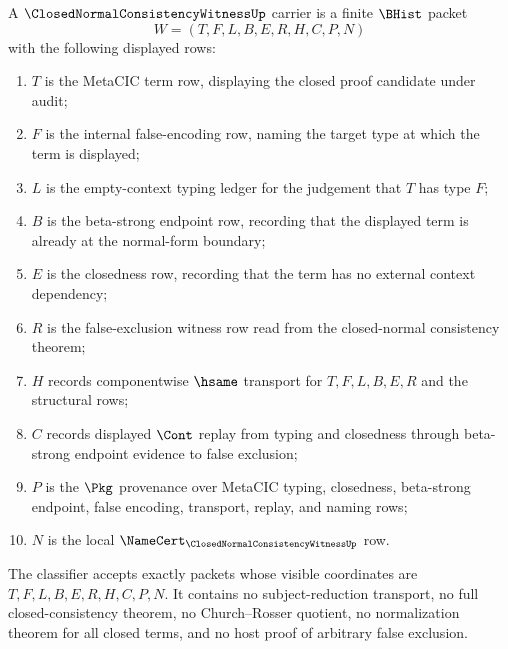 \begin{definition}\label{def:closed-normal-consistency-witness-carrier}
A $\ClosedNormalConsistencyWitnessUp$ carrier is a finite $\BHist$ packet
$$
W=(T,F,L,B,E,R,H,C,P,N)
$$
with the following displayed rows:
\begin{enumerate}
\item $T$ is the MetaCIC term row, displaying the closed proof candidate under audit;
\item $F$ is the internal false-encoding row, naming the target type at which the term is displayed;
\item $L$ is the empty-context typing ledger for the judgement that $T$ has type $F$;
\item $B$ is the beta-strong endpoint row, recording that the displayed term is already at the normal-form boundary;
\item $E$ is the closedness row, recording that the term has no external context dependency;
\item $R$ is the false-exclusion witness row read from the closed-normal consistency theorem;
\item $H$ records componentwise $\hsame$ transport for $T,F,L,B,E,R$ and the structural rows;
\item $C$ records displayed $\Cont$ replay from typing and closedness through beta-strong endpoint evidence to false exclusion;
\item $P$ is the $\Pkg$ provenance over MetaCIC typing, closedness, beta-strong endpoint, false encoding, transport, replay, and naming rows;
\item $N$ is the local $\NameCert_{\ClosedNormalConsistencyWitnessUp}$ row.
\end{enumerate}
The classifier accepts exactly packets whose visible coordinates are $T,F,L,B,E,R,H,C,P,N$. It contains no subject-reduction transport, no full closed-consistency theorem, no Church--Rosser quotient, no normalization theorem for all closed terms, and no host proof of arbitrary false exclusion.
\end{definition}

